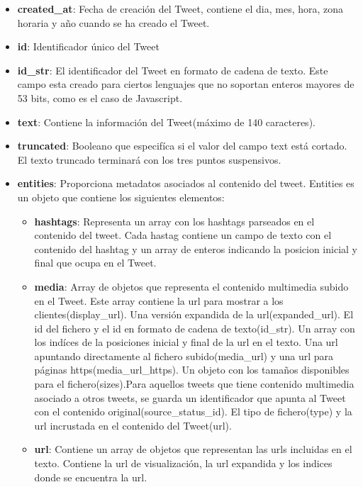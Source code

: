 \begin{itemize}

\item \textbf{created\_at}: Fecha de creación del Tweet, contiene el dia, mes, hora, zona horaria y año cuando se ha creado el Tweet.
\item \textbf{id}: Identificador único del Tweet
\item \textbf{id\_str}: El identificador del Tweet en formato de cadena de texto. Este campo esta creado para ciertos lenguajes que no soportan enteros mayores de 53 bits, como es el caso de Javascript.
\item \textbf{text}: Contiene la información del Tweet(máximo de 140 caracteres).
\item \textbf{truncated}: Booleano que especifíca si el valor del campo text está cortado. El texto truncado terminará con los tres puntos suspensivos.
\item \textbf{entities}: Proporciona metadatos asociados al contenido del tweet. Entities es un objeto que contiene los siguientes elementos:

\begin{itemize}

\item \textbf{hashtags}: Representa un array con los hashtags parseados en el contenido del tweet. Cada hastag contiene un campo de texto con el contenido del hashtag y un array de enteros indicando la posicion inicial y final que ocupa en el Tweet.

\item \textbf{media}: Array de objetos que representa el contenido multimedia subido en el Tweet. Este array contiene la url para mostrar a los clientes(display\_url). Una versión expandida de la url(expanded\_url). El id del fichero y el id en formato de cadena de texto(id\_str). Un array con los indíces de la posiciones inicial y final de la url en el texto. Una url apuntando directamente al fichero subido(media\_url) y una url para páginas https(media\_url\_https). Un objeto con los tamaños disponibles para el fichero(sizes).Para aquellos tweets que tiene contenido multimedia asociado a otros tweets, se guarda un identificador que apunta al Tweet con el contenido original(source\_status\_id). El tipo de fichero(type) y la url incrustada en el contenido del Tweet(url).

\item  \textbf{url}: Contiene un array de objetos que representan las urls incluidas en el texto. Contiene la url de visualización, la url expandida y los indices donde se encuentra la url.


\end{itemize}
\end{itemize}
